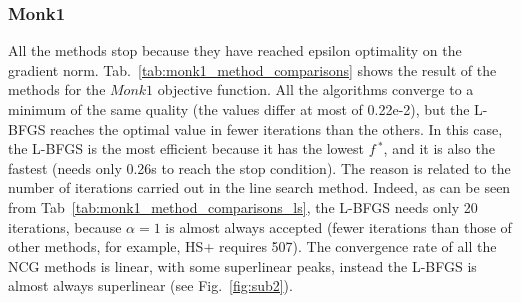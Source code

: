 \documentclass[11pt]{article}
\begin{document}


\subsubsection{Monk1}

All the methods stop because they have reached epsilon optimality on the gradient norm. Tab.~\ref{tab:monk1_method_comparisons} shows the result of the methods for the $Monk1$ objective function. All the algorithms converge to a minimum of the same quality (the values differ at most of 0.22e-2), but the L-BFGS reaches the optimal value in fewer iterations than the others. In this case, the L-BFGS is the most efficient because it has the lowest  $\textit{f}\,^*$, and it is also the fastest (needs only 0.26s to reach the stop condition). The reason is related to the number of iterations carried out in the line search method. Indeed, as can be seen from Tab~\ref{tab:monk1_method_comparisons_ls}, the L-BFGS needs only 20 iterations, because $\alpha = 1$ is almost always accepted (fewer iterations than those of other methods, for example, HS+ requires 507). The convergence rate of all the NCG methods is linear, with some superlinear peaks, instead the L-BFGS is almost always superlinear (see Fig.~\ref{fig:sub2}).
\end{document}
